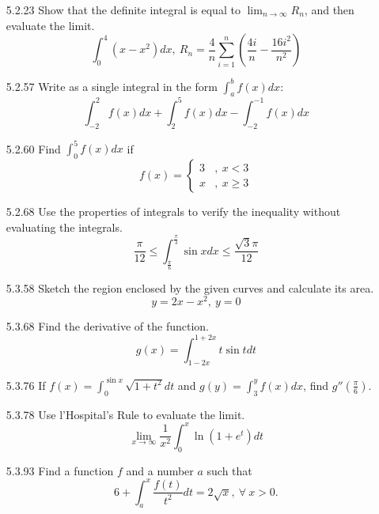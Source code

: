 \documentclass{article}
\begin{document}
\begin{enumerate}
\vspace{6cm}

\item[5.2.23]
    Show that the definite integral is equal to $\displaystyle  \lim_{n \to \infty} R_{n}$,
    and then evaluate the limit.
    \[
        \int_{0}^{4} (x - x^{2}) dx,\ R_{n} =
        \frac{4}{n} \sum_{i=1}^{n} \left( \frac{4i}{n} - \frac{16i^{2}}{n^{2}} \right)
    \]

\vspace{6cm}

\item[5.2.57]
    Write as a single integral in the form $\displaystyle \int_{a}^{b} f(x) dx$:
    \[
        \int_{-2}^{2} f(x) dx + \int_{2}^{5} f(x) dx - \int_{-2}^{-1} f(x)dx
    \]

\newpage

\item[5.2.60]
    Find $\displaystyle \int_{0}^{5} f(x) dx$ if
    \[
        f(x) =
        \begin{cases}
            3&,\ x < 3\\
            x&,\ x \geqslant 3
        \end{cases}
    \]

\vspace{5cm}

\item[5.2.68]
    Use the properties of integrals to verify the inequality without evaluating the integrals.
    \[
        \frac{\pi}{12} \leqslant \int_{\frac{\pi}{6}}^{\frac{\pi}{3}} \sin x dx
        \leqslant \frac{\sqrt{3} \pi }{12}
    \]

\vspace{5cm}

\item[5.3.58]
    Sketch the region enclosed by the given curves and calculate its area.
    \[
        y = 2x - x^{2},\ y = 0
    \]

\newpage

\item[5.3.68]
    Find the derivative of the function.
    \[
        g(x) = \int_{1-2x}^{1+2x} t \sin t dt
    \]

\vspace{4cm}


\item[5.3.76]
    If $\displaystyle f(x) = \int_{0}^{\sin x} \sqrt{1+t^{2}} dt$ and
    $\displaystyle  g(y) = \int_{3}^{y} f(x) dx$,
    find $g''(\frac{\pi}{6})$.

\vspace{4cm}

\item[5.3.78]
    Use l'Hospital's Rule to evaluate the limit.
    \[
        \lim_{x \to \infty} \frac{1}{x^{2}} \int_{0}^{x} \ln(1 + e^{t}) dt
    \]

\vspace{4cm}

\item[5.3.93]
    Find a function $f$ and a number $a$ such that
    \[
        6 + \int_{a}^{x} \frac{f(t)}{t^{2}}dt = 2 \sqrt{x},\ \forall\ x > 0.
    \]
\end{enumerate}
\end{document}
